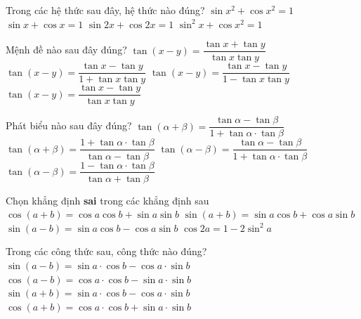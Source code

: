 \begin{ex}%
	Trong các hệ thức sau đây, hệ thức nào  đúng?
	 \choice
		{\True $\sin x^2 +\cos x^2 =1$} 
		{$\sin x+\cos  x=1$}
		{$\sin 2x+\cos  2x=1$}
		{$\sin ^{2} x+\cos  x^2 =1$}
\end{ex}

\begin{ex}%
	Mệnh  đề nào sau đây đúng?
	 \choice
		{$\tan (x-y)=\dfrac{\tan x+\tan y}{\tan  x \tan y}$}
		{\True $\tan (x-y)=\dfrac{\tan x-\tan y}{1+\tan x \tan  y}$}
		{$\tan (x-y)=\dfrac{\tan x-\tan y}{1-\tan x \tan  y}$}
		{$\tan  (x-y)=\dfrac{\tan x-\tan y}{\tan x \tan y}$}
\end{ex}

\begin{ex}%
	Phát biểu  nào sau đây đúng?
	\choice 
		{$\tan (\alpha+\beta)=\dfrac{\tan \alpha-\tan \beta}{1+\tan  \alpha \cdot \tan \beta}$}
		{$\tan (\alpha+\beta)=\dfrac{1+\tan \alpha \cdot \tan  \beta}{\tan \alpha-\tan \beta}$}
		{\True $\tan  (\alpha-\beta)=\dfrac{\tan \alpha-\tan \beta}{1+\tan \alpha \cdot \tan \beta}$}
		{$\tan (\alpha-\beta)=\dfrac{1-\tan  \alpha \cdot \tan \beta}{\tan \alpha+\tan \beta}$}
\end{ex}

\begin{ex}%
	Chọn  khẳng định \textbf{sai} trong các khẳng định sau
	\choice 
		{\True $\cos  (a+b)=\cos a \cos b+\sin a \sin b$}
		{$\sin (a+b)=\sin a \cos  b+\cos a \sin b$}
		{$\sin (a-b)=\sin a \cos b-\cos a \sin  b$}
		{$\cos 2 a=1-2 \sin  ^{2} a$}
\end{ex}

\begin{ex}%
	Trong các công thức  sau, công thức nào đúng?
	\choice 
		{\True $\sin (a-b)=\sin a  \cdot \cos b-\cos a \cdot \sin b$}
		{$\cos (a-b)=\cos a \cdot \cos b-\sin  a \cdot \sin b$}
		{$\sin (a+b)=\sin a  \cdot \cos b-\cos a \cdot \sin b$}
		{$\cos (a+b)=\cos a  \cdot \cos b+\sin a \cdot \sin b$}
\end{ex}

